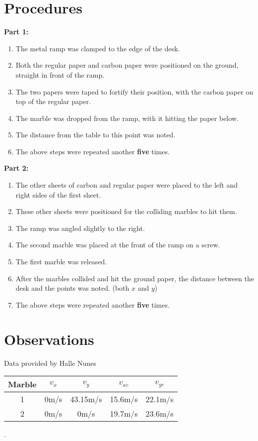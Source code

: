 \documentclass{article}
\begin{document}
\section*{Procedures}
\textbf{Part 1:}
\begin{enumerate}
    \item {The metal ramp was clamped to the edge of the desk.}
    \item {Both the regular paper and carbon paper were positioned on the ground, straight in front of the ramp.}
    \item {The two papers were taped to fortify their position, with the carbon paper on top of the regular paper.}
    \item {The marble was dropped from the ramp, with it hitting the paper below.}
    \item {The distance from the table to this point was noted.}
    \item {The above steps were repeated another \textbf{five} times.}
\end{enumerate}\leavevmode\newline
\textbf{Part 2:}
\begin{enumerate}
    \item {The other sheets of carbon and regular paper were placed to the left and right sides of the first sheet.}
    \item {These other sheets were positioned for the colliding marbles to hit them.}
    \item {The ramp was angled slightly to the right.}
    \item {The second marble was placed at the front of the ramp on a screw.}
    \item {The first marble was released.}
    \item {After the marbles collided and hit the ground paper, the distance between the desk and the points was noted. (both $x$ and $y$)}
    \item {The above steps were repeated another \textbf{five} times.}
\end{enumerate}\leavevmode


\section*{Observations}
Data provided by Halle Nunes\newline\newline
\begin{tabular}{ |c|c|c|c|c| }
    \hline
    Marble & $v_{x}$ & $v_{y}$  & $v_{xc}$ & $v_{yc}$ \\
    \hline
    1      & 0m/s    & 43.15m/s & 15.6m/s  & 22.1m/s  \\
    \hline
    2      & 0m/s    & 0m/s     & 19.7m/s  & 23.6m/s  \\
    \hline
\end{tabular}.\newline\newline
\end{document}

